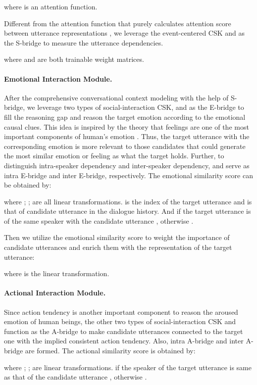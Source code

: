 \documentclass[letterpaper]{article} \usepackage{aaai23}  \usepackage{times}  \usepackage{helvet}  \usepackage{courier}  \usepackage[hyphens]{url}  \usepackage{graphicx} \urlstyle{rm} \def\UrlFont{\rm}  \usepackage{natbib}  \usepackage{caption} \frenchspacing  \setlength{\pdfpagewidth}{8.5in} \setlength{\pdfpageheight}{11in} \usepackage{algorithm}
\begin{document}
where  is an attention function.

Different from the attention function that purely calculates attention score between utterance representations \cite{gat}, we leverage the event-centered CSK  and  as the S-bridge to measure the utterance dependencies. 

where  and  are both trainable weight matrices.

\paragraph{Emotional Interaction Module.}
After the comprehensive conversational context modeling with the help of S-bridge, we leverage two types of social-interaction CSK,  and  as the E-bridge to fill the reasoning gap and reason the target emotion according to the emotional causal clues. This idea is inspired by the theory that feelings are one of the most important components of human's emotion \cite{theory}. Thus, the target utterance with the corresponding emotion is more relevant to those candidates that could generate the most similar emotion or feeling as what the target holds. Further, to distinguish intra-speaker dependency and inter-speaker dependency,  and  serve as intra E-bridge and inter E-bridge, respectively. The emotional similarity score can be obtained by:

where ; ;  are all linear transformations.  is the index of the target utterance and   is that of candidate utterance in the dialogue history. And  if the target utterance  is of the same speaker with the candidate utterance , otherwise .

Then we utilize the emotional similarity score  to weight the importance of candidate utterances and enrich them with the representation of the target utterance:

where  is the linear transformation.

\paragraph{Actional Interaction Module.}
Since action tendency is another important component to reason the aroused emotion of human beings, the other two types of social-interaction CSK  and  function as the A-bridge to make candidate utterances connected to the target one with the implied consistent action tendency. Also, intra A-bridge and inter A-bridge are formed. The actional similarity score is obtained by:

where ; ;  are linear transformations.  if the speaker of the target utterance  is same as that of the candidate utterance , otherwise .
\end{document}
